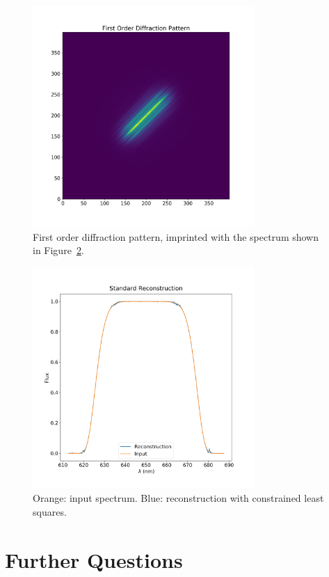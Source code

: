 \documentclass[a4paper,12pt]{article}
\begin{document}
\begin{figure}
\centering
\includegraphics[width=0.75\textwidth]{firstorder.png}
\caption{First order diffraction pattern, imprinted with the spectrum shown in Figure~\ref{spectrum}.}
\label{firstorder}
\end{figure}

\begin{figure}
\centering
\includegraphics[width=0.75\textwidth]{standard_recon.png}
\caption{Orange: input spectrum. Blue: reconstruction with constrained least squares.}
\label{spectrum}
\end{figure}

\section{Further Questions}
\end{document}
